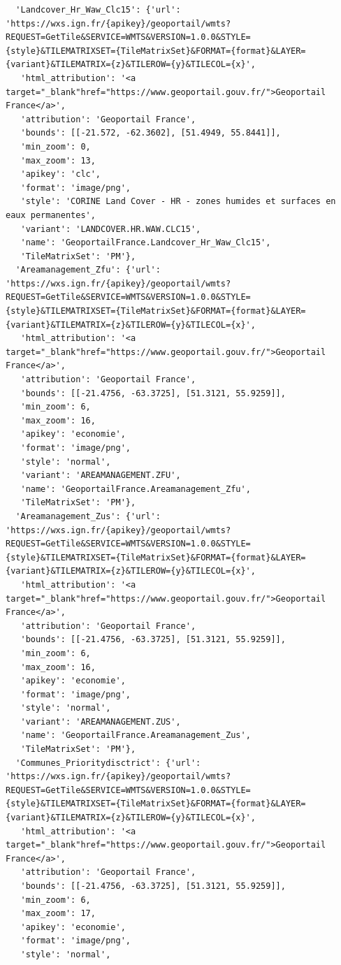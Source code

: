 \documentclass[
  letterpaper,
  DIV=11,
  numbers=noendperiod]{scrreprt}
\begin{document}
\begin{verbatim}
  'Landcover_Hr_Waw_Clc15': {'url': 'https://wxs.ign.fr/{apikey}/geoportail/wmts?REQUEST=GetTile&SERVICE=WMTS&VERSION=1.0.0&STYLE={style}&TILEMATRIXSET={TileMatrixSet}&FORMAT={format}&LAYER={variant}&TILEMATRIX={z}&TILEROW={y}&TILECOL={x}',
   'html_attribution': '<a target="_blank"href="https://www.geoportail.gouv.fr/">Geoportail France</a>',
   'attribution': 'Geoportail France',
   'bounds': [[-21.572, -62.3602], [51.4949, 55.8441]],
   'min_zoom': 0,
   'max_zoom': 13,
   'apikey': 'clc',
   'format': 'image/png',
   'style': 'CORINE Land Cover - HR - zones humides et surfaces en eaux permanentes',
   'variant': 'LANDCOVER.HR.WAW.CLC15',
   'name': 'GeoportailFrance.Landcover_Hr_Waw_Clc15',
   'TileMatrixSet': 'PM'},
  'Areamanagement_Zfu': {'url': 'https://wxs.ign.fr/{apikey}/geoportail/wmts?REQUEST=GetTile&SERVICE=WMTS&VERSION=1.0.0&STYLE={style}&TILEMATRIXSET={TileMatrixSet}&FORMAT={format}&LAYER={variant}&TILEMATRIX={z}&TILEROW={y}&TILECOL={x}',
   'html_attribution': '<a target="_blank"href="https://www.geoportail.gouv.fr/">Geoportail France</a>',
   'attribution': 'Geoportail France',
   'bounds': [[-21.4756, -63.3725], [51.3121, 55.9259]],
   'min_zoom': 6,
   'max_zoom': 16,
   'apikey': 'economie',
   'format': 'image/png',
   'style': 'normal',
   'variant': 'AREAMANAGEMENT.ZFU',
   'name': 'GeoportailFrance.Areamanagement_Zfu',
   'TileMatrixSet': 'PM'},
  'Areamanagement_Zus': {'url': 'https://wxs.ign.fr/{apikey}/geoportail/wmts?REQUEST=GetTile&SERVICE=WMTS&VERSION=1.0.0&STYLE={style}&TILEMATRIXSET={TileMatrixSet}&FORMAT={format}&LAYER={variant}&TILEMATRIX={z}&TILEROW={y}&TILECOL={x}',
   'html_attribution': '<a target="_blank"href="https://www.geoportail.gouv.fr/">Geoportail France</a>',
   'attribution': 'Geoportail France',
   'bounds': [[-21.4756, -63.3725], [51.3121, 55.9259]],
   'min_zoom': 6,
   'max_zoom': 16,
   'apikey': 'economie',
   'format': 'image/png',
   'style': 'normal',
   'variant': 'AREAMANAGEMENT.ZUS',
   'name': 'GeoportailFrance.Areamanagement_Zus',
   'TileMatrixSet': 'PM'},
  'Communes_Prioritydisctrict': {'url': 'https://wxs.ign.fr/{apikey}/geoportail/wmts?REQUEST=GetTile&SERVICE=WMTS&VERSION=1.0.0&STYLE={style}&TILEMATRIXSET={TileMatrixSet}&FORMAT={format}&LAYER={variant}&TILEMATRIX={z}&TILEROW={y}&TILECOL={x}',
   'html_attribution': '<a target="_blank"href="https://www.geoportail.gouv.fr/">Geoportail France</a>',
   'attribution': 'Geoportail France',
   'bounds': [[-21.4756, -63.3725], [51.3121, 55.9259]],
   'min_zoom': 6,
   'max_zoom': 17,
   'apikey': 'economie',
   'format': 'image/png',
   'style': 'normal',

\end{verbatim}
\end{document}
